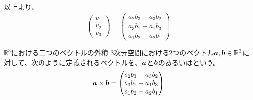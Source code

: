 \documentclass[../../../topic_linear-algebra]{subfiles}
\begin{document}
以上より、
\begin{equation*}
  \begin{pmatrix}
    v_1 \\
    v_2 \\
    v_3
  \end{pmatrix} = \begin{pmatrix}
    a_2b_3 - a_3b_2 \\
    a_3b_1 - a_1b_3 \\
    a_1b_2 - a_2b_1
  \end{pmatrix}
\end{equation*}

\begin{definition}{$\mathbb{R}^3$における二つのベクトルの外積}
  3次元空間における2つのベクトル$\vb*{a}, \vb*{b} \in \mathbb{R}^3$に対して、次のように定義されるベクトルを、$\vb*{a}$と$\vb*{b}$のあるいはという。
  \begin{equation*}
    \vb*{a} \times \vb*{b} = \begin{pmatrix}
      a_2b_3 - a_3b_2 \\
      a_3b_1 - a_1b_3 \\
      a_1b_2 - a_2b_1
    \end{pmatrix}
  \end{equation*}
\end{definition}
\end{document}
